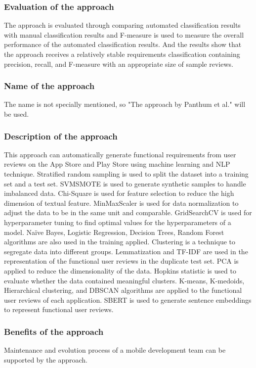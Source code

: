 \subsubsection{Evaluation of the approach}
The approach is evaluated through comparing automated
classification results with manual classification results and F-measure is used to measure the overall performance of the automated classification results. And the results show that the approach receives a relatively stable requirements classification containing precision, recall, and F-measure with an appropriate size of sample reviews.

\subsubsection{Name of the approach}
The name is not specially mentioned, so "The approach by Panthum et al." will be used.

\subsubsection{Description of the approach}
This approach can automatically generate functional requirements from user reviews on the App Store and Play Store using machine learning and NLP technique. 
Stratified random sampling is used to split the dataset into
a training set and a test set.
SVMSMOTE is used to generate synthetic samples to handle
imbalanced data.
Chi-Square is used for feature selection to
reduce the high dimension of textual feature.
MinMaxScaler is used for data normalization to adjust the data to be in the same unit and comparable.
GridSearchCV is used for hyperparameter tuning to find optimal values for the hyperparameters of a model.
Naïve Bayes, Logistic Regression, Decision Trees, Random Forest algorithms are also used in the training applied.
Clustering is a technique to segregate data into different
groups.
Lemmatization and TF-IDF are used in the representation of the functional user reviews in the duplicate test set.
PCA is applied to reduce the dimensionality of the data.
Hopkins statistic is used to evaluate whether the data contained meaningful clusters.
K-means, K-medoids, Hierarchical clustering, and DBSCAN algorithms are applied to the functional user reviews of each application.
SBERT is used to generate sentence embeddings to represent functional user reviews.



\subsubsection{Benefits  of the approach}
Maintenance and evolution process of a mobile development team can be supported by the approach.

